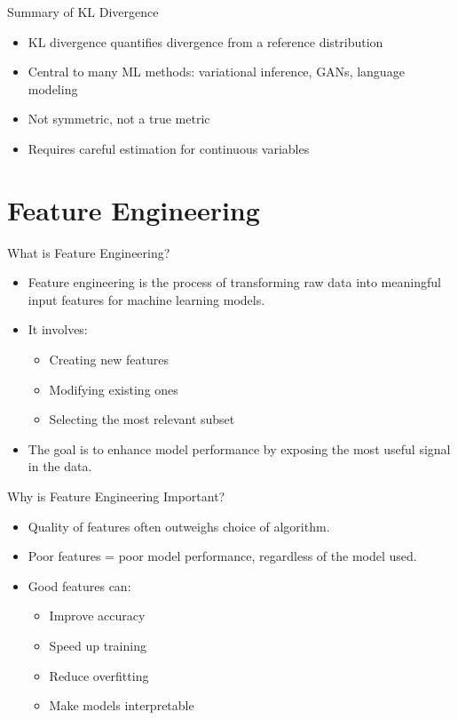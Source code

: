 \documentclass[aspectratio=169]{beamer}
\begin{document}
\begin{frame}[label={sec:org20c2393}]{Summary of KL Divergence}
\begin{itemize}
\item KL divergence quantifies divergence from a reference distribution
\item Central to many ML methods: variational inference, GANs, language modeling
\item Not symmetric, not a true metric
\item Requires careful estimation for continuous variables
\end{itemize}
\end{frame}

\section{Feature Engineering}
\label{sec:orgc50ecb3}

\begin{frame}[label={sec:org932f06c}]{What is Feature Engineering?}
\begin{itemize}
\item Feature engineering is the process of transforming raw data into
meaningful input features for machine learning models.
\item It involves:
\begin{itemize}
\item Creating new features
\item Modifying existing ones
\item Selecting the most relevant subset
\end{itemize}
\item The goal is to enhance model performance by exposing the most useful signal in the data.
\end{itemize}
\end{frame}

\begin{frame}[label={sec:org166b277}]{Why is Feature Engineering Important?}
\begin{itemize}
\item Quality of features often outweighs choice of algorithm.
\item Poor features = poor model performance, regardless of the model used.
\item Good features can:
\begin{itemize}
\item Improve accuracy
\item Speed up training
\item Reduce overfitting
\item Make models interpretable
\end{itemize}
\end{itemize}
\end{frame}
\end{document}
